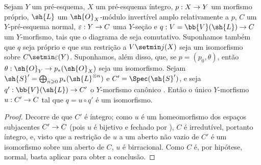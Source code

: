 \documentclass[oneside,10pt]{amsart}
\makeatletter
\renewcommand{\geq}{\geqslant}
\newcommand{\ega@arrow}[2]{\mathchoice{#1}{#2}{#2}{#2}}
\renewcommand{\to}{\ega@arrow{\longrightarrow}{\rightarrow}}
\let\EGAOriginalLabel\label
\renewcommand{\label}[1]{\phantomsection\EGAOriginalLabel{#1}}
\makeatother
\begin{document}
\begin{proposition}[8.11.7]
\label{II.8.11.7}
Sejam $Y$ um pré-esquema, $X$ um pré-esquema íntegro, $p:X\to Y$ um morfismo próprio, $\sh{L}$ um $\sh{O}_X$-módulo invertível amplo relativamente a $p$, $C$ um $Y$-pré-esquema normal, $\varepsilon:Y\to C$ uma $Y$-seção e $q:V=\bb{V}(\sh{L})\to C$ um $Y$-morfismo, tais que o diagrama de  seja comutativo.
Suponhamos também que $q$ seja próprio e que sua restrição a $V\setmin j(X)$ seja um isomorfismo sobre $C\setmin\varepsilon(Y)$.
Suponhamos, além disso, que, se $p=(p_0,\theta)$, então $\theta:\sh{O}_Y\to p_*(\sh{O}_X)$ seja um isomorfismo.
Sejam $\sh{S}'=\bigoplus_{n\geq0}p_*(\sh{L}^{\otimes n})$ e $C'=\Spec(\sh{S}')$, e seja $q':\bb{V}(\sh{L})\to C'$ o $Y$-morfismo canônico .
Então o único $Y$-morfismo $u:C'\to C$ tal que $q=u\circ q'$ é um isomorfismo.
\end{proposition}

\begin{proof}
Decorre de  que $C'$ é íntegro;
como $u$ é um homeomorfismo dos espaços subjacentes $C'\to C$ (pois $u$ é bijetivo e fechado por ), $C$ é irredutível, portanto íntegro, e, visto que a restrição de $u$ a um aberto não vazio de $C'$ é um isomorfismo sobre um aberto de $C$, $u$ é birracional.
Como $C$ é, por hipótese, normal, basta aplicar  para obter a conclusão.
\end{proof}
\end{document}
